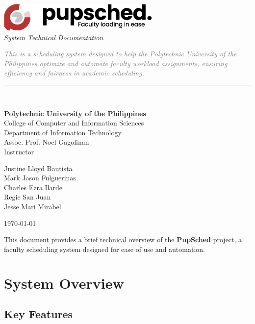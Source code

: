 \documentclass[12pt,letterpaper]{article}
\newcommand{\coverpage}{
\begin{titlepage}
    \centering
    \vspace*{1cm}
    \includegraphics[width=0.6\textwidth,keepaspectratio]{assets/pupsched_logo.pdf}\\[0.5cm]
    {\large\sffamily\itshape System Technical Documentation}\\[6cm]
    
    \begin{flushleft}
        \begin{minipage}{\textwidth}
            {\sffamily\itshape\textcolor{gray}{
            This is a scheduling system designed to help the Polytechnic University of the Philippines 
            optimize and automate faculty workload assignments, ensuring efficiency and fairness in academic scheduling.}}
        \end{minipage}
    \end{flushleft}
    
    \vspace{1.5cm}
    \noindent\rule{\textwidth}{0.4pt}\\[1.5cm]
    
    \begin{minipage}[t]{0.5\textwidth}
        \raggedright
        {\normalsize \textbf{Polytechnic University of the Philippines}}\\[0cm]
        {\normalsize College of Computer and Information Sciences}\\[0cm]
        {\normalsize Department of Information Technology}\\[1cm]
        
        {\normalsize Assoc. Prof. Noel Gagolinan}\\
        {\normalsize Instructor}\\[0.1cm]
    \end{minipage}
    \hfill
    \begin{minipage}[t]{0.48\textwidth}
        \raggedleft
        {\normalsize Justine Lloyd Bautista}\\
        {\normalsize Mark Jason Fulguerinas}\\
        {\normalsize Charles Ezra Ilarde}\\
        {\normalsize Regie San Juan}\\
        {\normalsize Jesse Mari Mirabel}\\
    \end{minipage}
    
    \vfill
    \centering
    {\normalsize \today}
\end{titlepage}
}
\begin{document}
\coverpage 

\renewcommand{\contentsname}{\centering\sffamily\Large Table of Contents}
\renewcommand{\cftsecleader}{\cftdotfill{\cftdotsep}}

\renewcommand{\cftsecfont}{\sffamily\bfseries\color{darkgray}}
\renewcommand{\cftsecpagefont}{\sffamily\bfseries\color{darkgray}}

\renewcommand{\cftsubsecfont}{\sffamily\color{gray}}
\renewcommand{\cftsubsecpagefont}{\sffamily\color{gray}}

\renewcommand{\cftsubsubsecfont}{\sffamily\color{lightgray}}
\renewcommand{\cftsubsubsecpagefont}{\sffamily\color{lightgray}}

\setlength{\cftbeforesecskip}{8pt}


\tableofcontents
\newpage


\begin{tcolorbox}[githubnote]
This document provides a brief technical overview of the \textbf{PupSched} project, 
a faculty scheduling system designed for ease of use and automation.
\end{tcolorbox}




\section{System Overview}

\subsection{Key Features}
\end{document}
